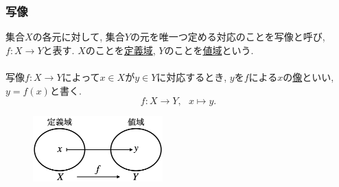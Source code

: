 \documentclass[dvipdfmx,cjk,10.2pt]{beamer}
\theoremstyle{definition}
\begin{document}
\begin{frame}
\frametitle{写像}

集合$X$の各元に対して, 集合$Y$の元を唯一つ定める対応のことを写像と呼び, $f:X \rightarrow Y$と表す. 
$X$のことを\underline{定義域}, $Y$のことを\underline{値域}という. \\
\ \\

写像$f:X\rightarrow Y$によって$x \in X$が$y\in Y$に対応するとき, $y$を$f$による$x$の\underline{像}といい, $y=f(x)$と書く. 
\vspace{-1mm}
$$
f:X \longrightarrow Y, \ \ \ x \mapsto y. 
$$

\vspace{-1mm}

 \begin{figure}[htbp]
 \begin{center} 
  \includegraphics[width=50mm]{map.png}
 \end{center}
\end{figure}

\vspace{-1mm}

\end{frame}



\end{document}

